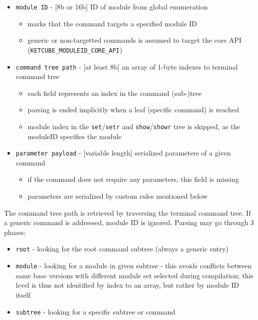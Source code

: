 \begin{itemize}
	\item \texttt{module ID} - [8b or 16b] ID of module from global enumeration
		\begin{itemize}
			\item marks that the command targets a specified module ID
			\item generic or non-targetted commands is assumed to target the core API (\texttt{KETCUBE\_MODULEID\_CORE\_API})
		\end{itemize}
	\item \texttt{command tree path} - [at least 8b] an array of 1-byte indexes to terminal command tree
		\begin{itemize}
			\item each field represents an index in the command (sub-)tree
			\item parsing is ended implicitly when a leaf (specific command) is reached
			\item module index in the \texttt{set}/\texttt{setr} and \texttt{show}/\texttt{showr} tree is skipped, as the moduleID specifies the module
		\end{itemize}
	\item \texttt{parameter payload} - [variable length] serialized parameters of a given command
		\begin{itemize}
			\item if the command does not require any parameters, this field is missing
			\item parameters are serialized by custom rules mentioned below
		\end{itemize}
\end{itemize}

The command tree path is retrieved by traversing the terminal command tree. If a generic command is addressed, module ID is ignored. Parsing may go through 3 phases:

\begin{itemize}
	\item \texttt{root} - looking for the root command subtree (always a generic entry)
	\item \texttt{module} - looking for a module in given subtree - this avoids conflicts between same base versions with different module set selected during compilation; this level is thus not identified by index to an array, but rather by module ID itself
	\item \texttt{subtree} - looking for a specific subtree or command
\end{itemize}


